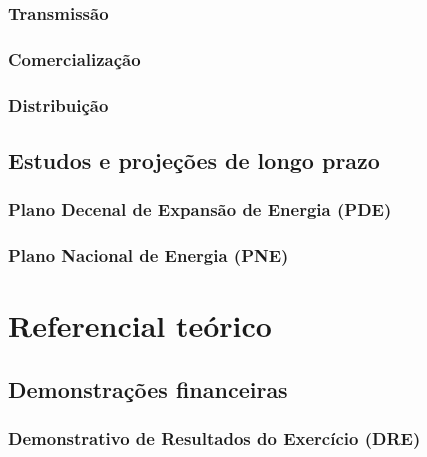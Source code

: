 \documentclass[grad,numbers]{coppe}
\begin{document}
  \hypertarget{transmissuxe3o}{%
  \subsection{Transmissão}\label{transmissuxe3o}}
  
  \hypertarget{comercializauxe7uxe3o}{%
  \subsection{Comercialização}\label{comercializauxe7uxe3o}}
  
  \hypertarget{distribuiuxe7uxe3o}{%
  \subsection{Distribuição}\label{distribuiuxe7uxe3o}}
  
  \hypertarget{estudos-e-projeuxe7uxf5es-de-longo-prazo}{%
  \section{Estudos e projeções de longo prazo}\label{estudos-e-projeuxe7uxf5es-de-longo-prazo}}
  
  \hypertarget{plano-decenal-de-expansuxe3o-de-energia-pde}{%
  \subsection{Plano Decenal de Expansão de Energia (PDE)}\label{plano-decenal-de-expansuxe3o-de-energia-pde}}
  
  \hypertarget{plano-nacional-de-energia-pne}{%
  \subsection{Plano Nacional de Energia (PNE)}\label{plano-nacional-de-energia-pne}}
  
  \hypertarget{referencial-teuxf3rico}{%
  \chapter{Referencial teórico}\label{referencial-teuxf3rico}}
  
  \hypertarget{demonstrauxe7uxf5es-financeiras}{%
  \section{Demonstrações financeiras}\label{demonstrauxe7uxf5es-financeiras}}
  
  \hypertarget{demonstrativo-de-resultados-do-exercuxedcio-dre}{%
  \subsection{Demonstrativo de Resultados do Exercício (DRE)}\label{demonstrativo-de-resultados-do-exercuxedcio-dre}}
  
\end{document}
